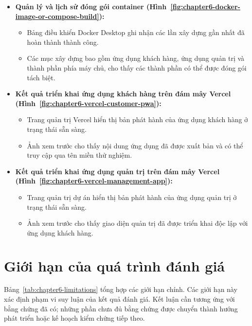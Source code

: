 \begin{itemize}
  \item \textbf{Quản lý và lịch sử đóng gói container (Hình~\ref{fig:chapter6-docker-image-or-compose-build}):}
    \begin{itemize}
      \item Bảng điều khiển Docker Desktop ghi nhận các lần xây dựng gần nhất đã hoàn thành thành công.
      \item Các mục xây dựng bao gồm ứng dụng khách hàng, ứng dụng quản trị và thành phần phía máy chủ, cho thấy các thành phần có thể được đóng gói tách biệt.
    \end{itemize}

  \item \textbf{Kết quả triển khai ứng dụng khách hàng trên đám mây Vercel (Hình~\ref{fig:chapter6-vercel-customer-pwa}):}
    \begin{itemize}
      \item Trang quản trị Vercel hiển thị bản phát hành của ứng dụng khách hàng ở trạng thái sẵn sàng.
      \item Ảnh xem trước cho thấy nội dung ứng dụng đã được xuất bản và có thể truy cập qua tên miền thử nghiệm.
    \end{itemize}

  \item \textbf{Kết quả triển khai ứng dụng quản trị trên đám mây Vercel (Hình~\ref{fig:chapter6-vercel-management-app}):}
    \begin{itemize}
      \item Trang quản trị dự án hiển thị bản phát hành của ứng dụng quản trị ở trạng thái sẵn sàng.
      \item Ảnh xem trước cho thấy giao diện quản trị đã được triển khai độc lập với ứng dụng khách hàng.
    \end{itemize}
\end{itemize}

\section{Giới hạn của quá trình đánh giá}

Bảng~\ref{tab:chapter6-limitations} tổng hợp các giới hạn chính. Các giới hạn này xác định phạm vi suy luận của kết quả đánh giá. Kết luận cần tương ứng với bằng chứng đã có; những phần chưa đủ bằng chứng được chuyển thành hướng phát triển hoặc kế hoạch kiểm chứng tiếp theo.

